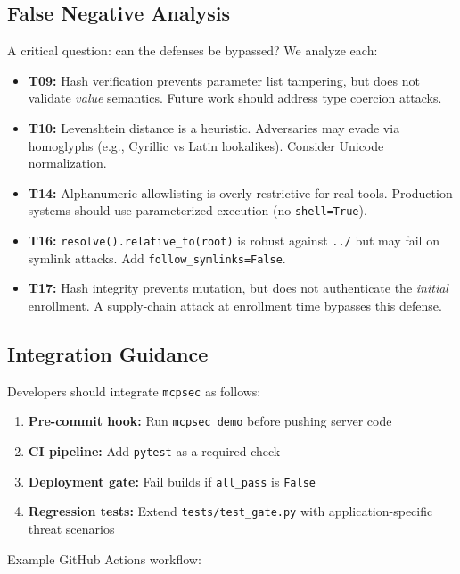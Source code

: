 \documentclass[11pt]{article}
\begin{document}
\subsection{False Negative Analysis}

A critical question: can the defenses be bypassed? We analyze each:

\begin{itemize}
    \item \textbf{T09:} Hash verification prevents parameter list tampering, but does not validate \emph{value} semantics. Future work should address type coercion attacks.
    \item \textbf{T10:} Levenshtein distance is a heuristic. Adversaries may evade via homoglyphs (e.g., Cyrillic vs Latin lookalikes). Consider Unicode normalization.
    \item \textbf{T14:} Alphanumeric allowlisting is overly restrictive for real tools. Production systems should use parameterized execution (no \texttt{shell=True}).
    \item \textbf{T16:} \texttt{resolve().relative\_to(root)} is robust against \texttt{../} but may fail on symlink attacks. Add \texttt{follow\_symlinks=False}.
    \item \textbf{T17:} Hash integrity prevents mutation, but does not authenticate the \emph{initial} enrollment. A supply-chain attack at enrollment time bypasses this defense.
\end{itemize}

\subsection{Integration Guidance}

Developers should integrate \texttt{mcpsec} as follows:

\begin{enumerate}
    \item \textbf{Pre-commit hook:} Run \texttt{mcpsec demo} before pushing server code
    \item \textbf{CI pipeline:} Add \texttt{pytest} as a required check
    \item \textbf{Deployment gate:} Fail builds if \texttt{all\_pass} is \texttt{False}
    \item \textbf{Regression tests:} Extend \texttt{tests/test\_gate.py} with application-specific threat scenarios
\end{enumerate}

Example GitHub Actions workflow:
\end{document}
